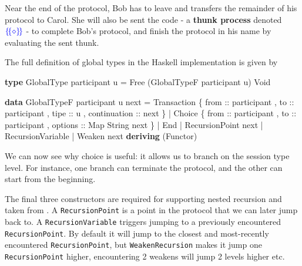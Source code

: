 \documentclass[runningheads,plain]{llncs}
\newenvironment{Shaded}{}{}
\newcommand{\KeywordTok}[1]{\textcolor[rgb]{0.00,0.44,0.13}{\textbf{#1}}}
\newcommand{\DataTypeTok}[1]{\textcolor[rgb]{0.56,0.13,0.00}{#1}}
\newcommand{\OtherTok}[1]{\textcolor[rgb]{0.00,0.44,0.13}{#1}}
\newcommand{\FunctionTok}[1]{\textcolor[rgb]{0.02,0.16,0.49}{#1}}
\newcommand{\NormalTok}[1]{#1}
\begin{document}
Near the end of the protocol, Bob has to leave and transfers the
remainder of his protocol to Carol. She will also be sent the code - a
\textbf{thunk process} denoted \(\textcolor{blue}{\{\!\{\diamond\}\!\}}\) - to
complete Bob's protocol, and finish the protocol in his name by
evaluating the sent thunk.

The full definition of global types in the Haskell implementation is
given by

\begin{Shaded}
\begin{Highlighting}[]
\KeywordTok{type} \DataTypeTok{GlobalType}\NormalTok{ participant u }\FunctionTok{=} 
    \DataTypeTok{Free}\NormalTok{ (}\DataTypeTok{GlobalTypeF}\NormalTok{ participant u) }\DataTypeTok{Void}

\KeywordTok{data} \DataTypeTok{GlobalTypeF}\NormalTok{ participant u next}
    \FunctionTok{=} \DataTypeTok{Transaction} 
\NormalTok{        \{}\OtherTok{ from ::}\NormalTok{ participant}
\NormalTok{        ,}\OtherTok{ to ::}\NormalTok{ participant}
\NormalTok{        ,}\OtherTok{ tipe ::}\NormalTok{ u}
\NormalTok{        ,}\OtherTok{ continuation ::}\NormalTok{  next }
\NormalTok{        \} }
    \FunctionTok{|} \DataTypeTok{Choice} 
\NormalTok{        \{}\OtherTok{ from ::}\NormalTok{ participant}
\NormalTok{        ,}\OtherTok{ to ::}\NormalTok{ participant}
\NormalTok{        ,}\OtherTok{ options ::} \DataTypeTok{Map} \DataTypeTok{String}\NormalTok{ next }
\NormalTok{        \}}
    \FunctionTok{|} \DataTypeTok{End}
    \FunctionTok{|} \DataTypeTok{RecursionPoint}\NormalTok{ next}
    \FunctionTok{|} \DataTypeTok{RecursionVariable}
    \FunctionTok{|} \DataTypeTok{Weaken}\NormalTok{ next}
    \KeywordTok{deriving}\NormalTok{ (}\DataTypeTok{Functor}\NormalTok{)}
\end{Highlighting}
\end{Shaded}

We can now see why choice is useful: it allows us to branch on the
session type level. For instance, one branch can terminate the protocol,
and the other can start from the beginning.

The final three constructors are required for supporting nested
recursion and taken from \cite{van2017session}. A
\texttt{RecursionPoint} is a point in the protocol that we can later
jump back to. A \texttt{RecursionVariable} triggers jumping to a
previously encountered \texttt{RecursionPoint}. By default it will jump
to the closest and most-recently encountered \texttt{RecursionPoint},
but \texttt{WeakenRecursion} makes it jump one \texttt{RecursionPoint}
higher, encountering 2 weakens will jump 2 levels higher etc.
\end{document}
